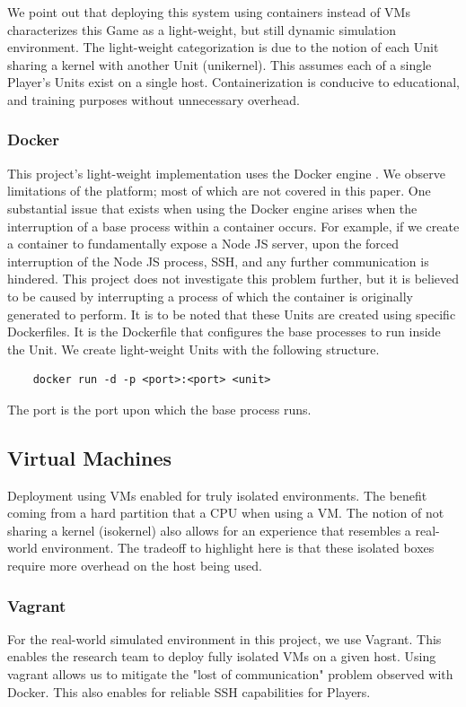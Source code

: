 \documentclass[10pt, titlepage, twocolumn]{article}
\newcommand{\ii}{\indent\indent}
\begin{document}
We point out that deploying this system using containers instead of VMs characterizes this Game as a light-weight, but still dynamic simulation environment. The light-weight categorization is due to the notion of each Unit sharing a kernel with another Unit (unikernel). This assumes each of a single Player's Units exist on a single host. Containerization is conducive to educational, and training purposes without unnecessary overhead.


\subsubsection{Docker}
\ii
This project's light-weight implementation uses the Docker engine \cite{docker}. We observe limitations of the platform; most of which are not covered in this paper. One substantial issue that exists when using the Docker engine arises when the interruption of a base process within a container occurs. For example, if we create a container to fundamentally expose a Node JS server, upon the forced interruption of the Node JS process, SSH, and any further communication is hindered. This project does not investigate this problem further, but it is believed to be caused by interrupting a process of which the container is originally generated to perform. It is to be noted that these Units are created using specific Dockerfiles. It is the Dockerfile that configures the base processes to run inside the Unit. We create light-weight Units with the following structure. 

\begin{verbatim}
    docker run -d -p <port>:<port> <unit>
\end{verbatim}

The port is the port upon which the base process runs.

\subsection{Virtual Machines}
\ii
Deployment using VMs enabled for truly isolated environments. The benefit coming from a hard partition that a CPU when using a VM. The notion of not sharing a kernel (isokernel) also allows for an experience that resembles a real-world environment. The tradeoff to highlight here is that these isolated boxes require more overhead on the host being used.


\subsubsection{Vagrant}
\ii
For the real-world simulated environment in this project, we use Vagrant. This enables the research team to deploy fully isolated VMs on a given host. Using vagrant allows us to mitigate the "lost of communication" problem observed with Docker. This also enables for reliable SSH capabilities for Players.
\end{document}
